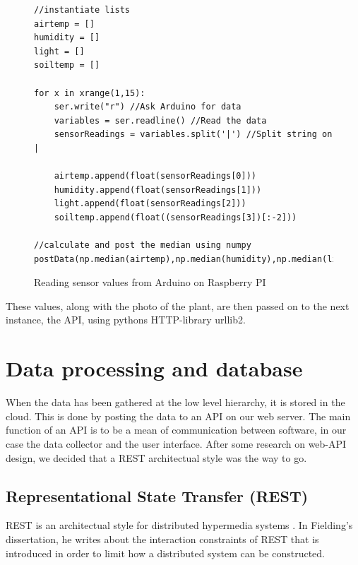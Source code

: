 \lstset{language=Python} 
\begin{figure}
\begin{lstlisting}
//instantiate lists
airtemp = []
humidity = []
light = []
soiltemp = [] 

for x in xrange(1,15): 
	ser.write("r") //Ask Arduino for data
	variables = ser.readline() //Read the data
	sensorReadings = variables.split('|') //Split string on |

	airtemp.append(float(sensorReadings[0]))
	humidity.append(float(sensorReadings[1]))
	light.append(float(sensorReadings[2]))
	soiltemp.append(float((sensorReadings[3])[:-2])) 

//calculate and post the median using numpy
postData(np.median(airtemp),np.median(humidity),np.median(light),np.median(soiltemp)) 
\end{lstlisting}
\caption{Reading sensor values from Arduino on Raspberry PI}
\label{fig:raspberrycode}
\end{figure}

These values, along with the photo of the plant, are then passed on to the next instance, the API, using pythons HTTP-library urllib2. 

\section{Data processing and database}
When the data has been gathered at the low level hierarchy, it is stored in the cloud. This is done by posting the data to an API on our web server. The main function of an API is to be a mean of communication between software, in our case the data collector and the user interface. After some research on web-API design, we decided that a REST architectual style was the way to go. 

\subsection{Representational State Transfer (REST)}
REST is an architectual style for distributed hypermedia systems \citep{fielding2000architectural}. In Fielding's dissertation, he writes about the interaction constraints of REST that is introduced in order to limit how a distributed system can be constructed. 

